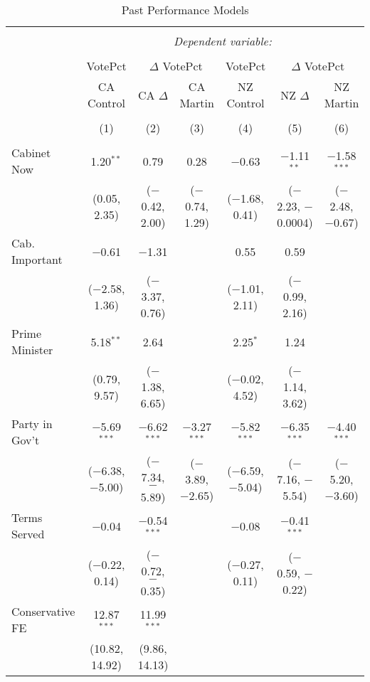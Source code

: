 
\begin{table}[!htb] \centering 
  \caption{Past Performance Models} 
  \label{} 
\begin{tabular}{@{\extracolsep{5pt}}lcccccc} 
\\[-1.8ex]\hline 
\hline \\[-1.8ex] 
 & \multicolumn{6}{c}{\textit{Dependent variable:}} \\ 
\cline{2-7} 
\\[-1.8ex] & VotePct & \multicolumn{2}{c}{$\Delta$ VotePct} & VotePct & \multicolumn{2}{c}{$\Delta$ VotePct} \\ 
 & CA Control & CA $\Delta$ & CA Martin & NZ Control & NZ $\Delta$ & NZ Martin \\ 
\\[-1.8ex] & (1) & (2) & (3) & (4) & (5) & (6)\\ 
\hline \\[-1.8ex] 
 Cabinet Now & 1.20$^{**}$ & 0.79 & 0.28 & $-$0.63 & $-$1.11$^{**}$ & $-$1.58$^{***}$ \\ 
  & (0.05, 2.35) & ($-$0.42, 2.00) & ($-$0.74, 1.29) & ($-$1.68, 0.41) & ($-$2.23, $-$0.0004) & ($-$2.48, $-$0.67) \\ 
  Cab. Important & $-$0.61 & $-$1.31 &  & 0.55 & 0.59 &  \\ 
  & ($-$2.58, 1.36) & ($-$3.37, 0.76) &  & ($-$1.01, 2.11) & ($-$0.99, 2.16) &  \\ 
  Prime Minister & 5.18$^{**}$ & 2.64 &  & 2.25$^{*}$ & 1.24 &  \\ 
  & (0.79, 9.57) & ($-$1.38, 6.65) &  & ($-$0.02, 4.52) & ($-$1.14, 3.62) &  \\ 
  Party in Gov't & $-$5.69$^{***}$ & $-$6.62$^{***}$ & $-$3.27$^{***}$ & $-$5.82$^{***}$ & $-$6.35$^{***}$ & $-$4.40$^{***}$ \\ 
  & ($-$6.38, $-$5.00) & ($-$7.34, $-$5.89) & ($-$3.89, $-$2.65) & ($-$6.59, $-$5.04) & ($-$7.16, $-$5.54) & ($-$5.20, $-$3.60) \\ 
  Terms Served & $-$0.04 & $-$0.54$^{***}$ &  & $-$0.08 & $-$0.41$^{***}$ &  \\ 
  & ($-$0.22, 0.14) & ($-$0.72, $-$0.35) &  & ($-$0.27, 0.11) & ($-$0.59, $-$0.22) &  \\ 
  Conservative FE & 12.87$^{***}$ & 11.99$^{***}$ &  &  &  &  \\ 
  & (10.82, 14.92) & (9.86, 14.13) &  &  &  &  \\ 

\end{tabular}
\end{table}

